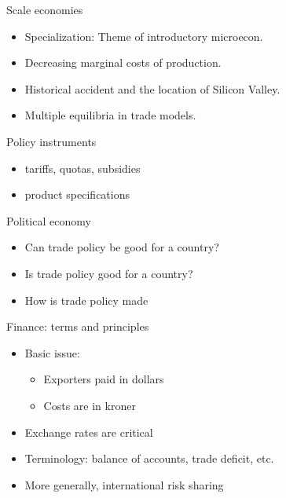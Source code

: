 \documentclass[ignorenonframetext,]{beamer}
\begin{document}
\begin{frame}{Scale economies}

    \begin{itemize}
        \item Specialization: Theme of introductory microecon.
        \item Decreasing marginal costs of production.
        \item Historical accident and the location of Silicon Valley.
        \item Multiple equilibria in trade models.
    \end{itemize}

\end{frame}

\begin{frame}{Policy instruments}

    \begin{itemize}
        \item tariffs, quotas, subsidies
        \item product specifications
    \end{itemize}

\end{frame}

\begin{frame}{Political economy}

    \begin{itemize}
        \item Can trade policy be good for a country?
        \item Is trade policy good for a country?
        \item How is trade policy made
    \end{itemize}

\end{frame}

\begin{frame}{Finance: terms and principles}

    \begin{itemize}
        \item Basic issue:
        \begin{itemize}
            \item Exporters paid in dollars
            \item Costs are in kroner
        \end{itemize}
        \item Exchange rates are critical
        \item Terminology: balance of accounts, trade deficit, etc. 
        \item More generally, international risk sharing
    \end{itemize}

\end{frame}
\end{document}

